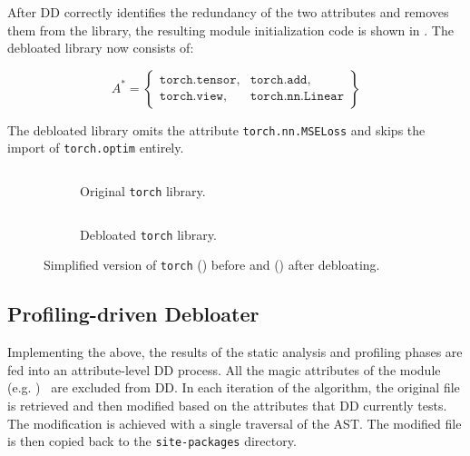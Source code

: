\documentclass[sigplan,screen]{acmart}
\newcounter{example}
\newcommand{\module}[1]{{\texttt{#1}}}
\newcommand{\attribute}[1]{\texttt{#1}}
\begin{document}
After DD correctly identifies the redundancy of the two attributes and removes them from the library, the resulting module initialization code is shown in .
The debloated library now consists of:

\vspace{-0.5em}
{\footnotesize\[
A^{*} = \left\{
\begin{array}{ll}
\attribute{torch.tensor}, & \attribute{torch.add}, \\
\attribute{torch.view}, & \attribute{torch.nn.Linear}
\end{array}
\right\}
\]}

\noindent
The debloated library omits the attribute \attribute{torch.nn.MSELoss} and skips the import of \module{torch.optim} entirely.

\begin{figure*}[t]
    \centering
    \begin{subfigure}[b]{0.9\columnwidth}
        \centering
        \inputminted[fontsize=\scriptsize]{python}{chapters/6_debloating/torch.py}
        \caption{Original \module{torch} library.}
        \label{fig:torch-original}
    \end{subfigure}
    \hfill
    \begin{subfigure}[b]{0.9\columnwidth}
        \centering
        \inputminted[fontsize=\scriptsize]{python}{chapters/6_debloating/torch-debloated.py}
        \caption{Debloated \module{torch} library.}
        \label{fig:torch-example-debloated}
    \end{subfigure}
    \caption{Simplified version of \module{torch} () before and () after debloating.}
    \label{fig:torch_libraries}
\end{figure*}
 
\subsection{Profiling-driven Debloater}

Implementing the above, the results of the static analysis and profiling phases are fed into an attribute-level DD process.
All the magic attributes of the module (e.g. )~\cite{pep302} are excluded from DD.
In each iteration of the algorithm, the original  file is retrieved and then modified based on the attributes that DD currently tests.
The modification is achieved with a single traversal of the AST.
The modified  file is then copied back to the \verb|site-packages| directory.
\end{document}

